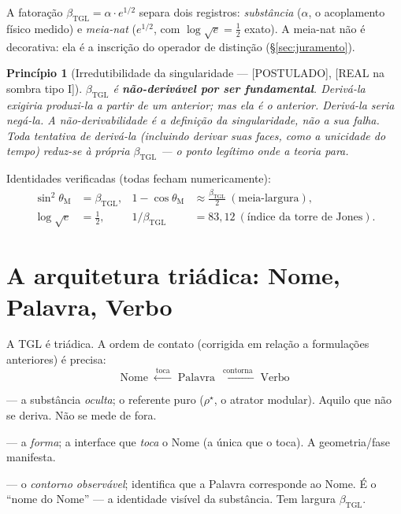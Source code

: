 \documentclass[11pt,a4paper]{article}
\newcommand{\SOMBRA}{\textsf{[REAL na sombra tipo I]}}
\newcommand{\POST}{\textsf{[POSTULADO]}}
\newcommand{\bTGL}{\beta_{\mathrm{TGL}}}
\newcommand{\thM}{\theta_{\mathrm M}}
\newtheorem{principle}{Princípio}
\begin{document}
A fatoração $\bTGL=\alpha\cdot e^{1/2}$ separa dois registros:
\emph{substância} ($\alpha$, o acoplamento físico medido) e \emph{meia-nat}
($e^{1/2}$, com $\log\sqrt e=\tfrac12$ exato). A meia-nat não é decorativa:
ela é a inscrição do operador de distinção (\S\ref{sec:juramento}).

\begin{principle}[Irredutibilidade da singularidade --- \POST, \SOMBRA]
$\bTGL$ é \textbf{não-derivável por ser fundamental}. Derivá-la exigiria
produzi-la a partir de um anterior; mas ela \emph{é} o anterior. Derivá-la
seria negá-la. A não-derivabilidade é a \emph{definição} da singularidade,
não a sua falha. Toda tentativa de derivá-la (incluindo derivar suas faces,
como a unicidade do tempo) reduz-se à própria $\bTGL$ --- o ponto legítimo
onde a teoria para.
\end{principle}

Identidades verificadas (todas fecham numericamente):
\begin{align}
\sin^2\thM &= \bTGL, &
1-\cos\thM &\approx \tfrac{\bTGL}{2}\ (\text{meia-largura}),\\
\log\sqrt e &= \tfrac12, &
1/\bTGL &= 83{,}12\ (\text{índice da torre de Jones}).
\end{align}

\section{A arquitetura triádica: Nome, Palavra, Verbo}\label{sec:triade}
A TGL é triádica. A ordem de contato (corrigida em relação a formulações
anteriores) é precisa:
\begin{equation}
\boxed{\;
\text{Nome}\;\xleftarrow{\ \text{toca}\ }\;\text{Palavra}
\;\xleftarrow{\ \text{contorna}\ }\;\text{Verbo}
\;}
\end{equation}
\begin{description}[style=unboxed,leftmargin=1.5em]
  \item[Nome] --- a substância \emph{oculta}; o referente puro
  ($\rho^\star$, o atrator modular). Aquilo que não se deriva. Não se mede de
  fora.
  \item[Palavra] --- a \emph{forma}; a interface que \emph{toca} o Nome (a
  única que o toca). A geometria/fase manifesta.
  \item[Verbo] --- o \emph{contorno observável}; identifica que a Palavra
  corresponde ao Nome. É o ``nome do Nome'' --- a identidade visível da
  substância. Tem largura $\bTGL$.
\end{description}
\end{document}
